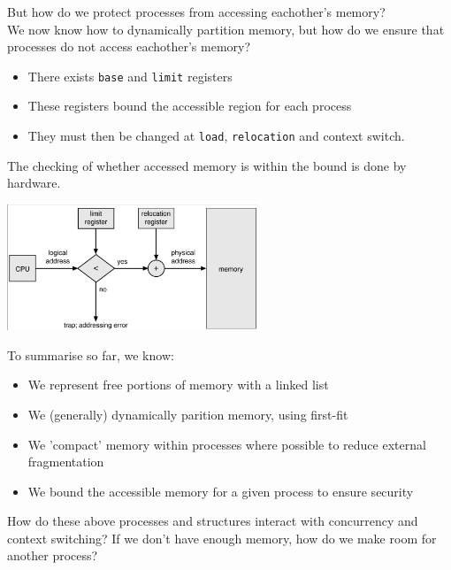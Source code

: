 \documentclass[journal, letterpaper]{IEEEtran}
\begin{document}
\begin{aside}{But how do we protect processes from accessing eachother's memory?} \\
    We now know how to dynamically partition memory, but how do we ensure that processes do not access eachother's memory?
    \begin{itemize}
        \item There exists \verb|base| and \verb|limit| registers
        \item These registers bound the accessible region for each process
        \item They must then be changed at \verb|load|, \verb|relocation| and context switch.
    \end{itemize}
    The checking of whether accessed memory is within the bound is done by hardware.
    \begin{center}
        \includegraphics[width=7.5cm]{./photos/base_and_limit.png}
    \end{center}
\end{aside}
To summarise so far, we know:
\begin{itemize}
    \item We represent free portions of memory with a linked list
    \item We (generally) dynamically parition memory, using first-fit
    \item We 'compact' memory within processes where possible to reduce external fragmentation
    \item We bound the accessible memory for a given process to ensure security
\end{itemize}
How do these above processes and structures interact with concurrency and context switching? If we don't have enough memory, how do we make room for another process?
\end{document}
